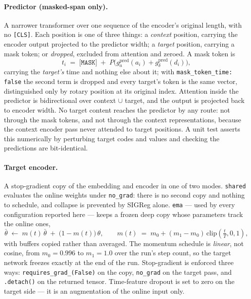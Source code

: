 \documentclass[11pt,a4paper]{article}
\newcommand{\code}[1]{\texttt{\small #1}}
\begin{document}
\paragraph{Predictor (masked-span only).}
A narrower transformer over one sequence of the encoder's original length, with
no \code{[CLS]}. Each position is one of three things: a \emph{context}
position, carrying the encoder output projected to the predictor width; a
\emph{target} position, carrying a mask token; or \emph{dropped}, excluded from
attention and zeroed. A mask token is
\begin{equation}
t_i \;=\; \texttt{[MASK]} \;+\; P\big(g^{\mathrm{pred}}_{a}(a_i)
                                      + g^{\mathrm{pred}}_{\delta}(d_i)\big),
\end{equation}
carrying the \emph{target's} time and nothing else about it; with
\code{mask\_token\_time: false} the second term is dropped and every target's
token is the same vector, distinguished only by rotary position at its original
index. Attention inside the predictor is bidirectional over
context $\cup$ target, and the output is projected back to encoder width. No
target content reaches the predictor by any route: not through the mask tokens,
and not through the context representations, because the context encoder pass
never attended to target positions. A unit test asserts this numerically by
perturbing target codes and values and checking the predictions are
bit-identical.

\paragraph{Target encoder.}
A stop-gradient copy of the embedding and encoder in one of two modes.
\code{shared} evaluates the online weights under \code{no\_grad}: there is no
second copy and nothing to schedule, and collapse is prevented by SIGReg alone.
\code{ema} --- used by every configuration reported here --- keeps a frozen
deep copy whose parameters track the online ones,
\begin{equation}
\bar\theta \;\leftarrow\; m(t)\,\bar\theta \;+\; \big(1 - m(t)\big)\,\theta,
\qquad
m(t) \;=\; m_0 + (m_1 - m_0)\,\mathrm{clip}\!\left(\tfrac{t}{T}, 0, 1\right),
\end{equation}
with buffers copied rather than averaged. The momentum schedule is
\emph{linear}, not cosine, from $m_0 = 0.996$ to $m_1 = 1.0$ over the run's step
count, so the target network freezes exactly at the end of the run. Stop-gradient
is enforced three ways: \code{requires\_grad\_(False)} on the copy,
\code{no\_grad} on the target pass, and \code{.detach()} on the returned tensor.
Time-feature dropout is set to zero on the target side --- it is an augmentation
of the online input only.
\end{document}
